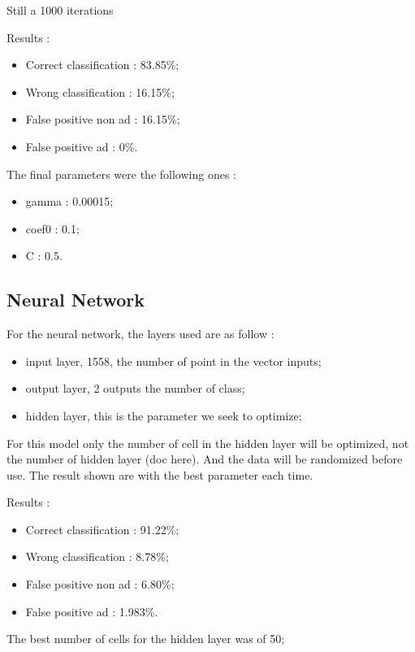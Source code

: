 Still a 1000 iterations

Results :
\begin{itemize}
  \item Correct classification : 83.85\%;
  \item Wrong classification : 16.15\%;
  \item False positive non ad : 16.15\%;
  \item False positive ad : 0\%.
\end{itemize}

The final parameters were the following ones :
\begin{itemize}
  \item gamma : 0.00015;
  \item coef0 : 0.1;
  \item C : 0.5.
\end{itemize}

\subsection{Neural Network}

For the neural network, the layers used are as follow :
  \begin{itemize}
    \item input layer, 1558, the number of point in the vector inputs;
    \item output layer, 2 outputs the number of class;
    \item hidden layer, this is the parameter we seek to optimize;
  \end{itemize}

 For this model only the number of cell in the hidden layer will be optimized, not the number of hidden layer (doc here). And the data will be randomized before use. The result shown are with the best parameter each time.

  Results :
  \begin{itemize}
    \item Correct classification : 91.22\%;
    \item Wrong classification : 8.78\%;
    \item False positive non ad : 6.80\%;
    \item False positive ad : 1.983\%.
  \end{itemize}

  The best number of cells for the hidden layer was of 50;


